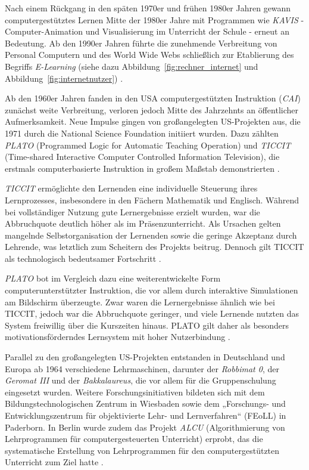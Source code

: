 Nach einem Rückgang in den späten 1970er und frühen 1980er Jahren gewann computergestütztes Lernen Mitte der 1980er Jahre mit Programmen wie \textit{KAVIS} - Computer-Animation und Visualisierung im Unterricht der Schule - erneut an Bedeutung. Ab den 1990er Jahren führte die zunehmende Verbreitung von Personal Computern und des World Wide Webs schließlich zur Etablierung des Begriffs \textit{E-Learning} (siehe dazu Abbildung~\ref{fig:rechner_internet} und Abbildung~\ref{fig:internetnutzer}) \parencite[S.~11]{niegemann_kompendium_2008}.

\iffalse
 Ab den 1960er Jahren fanden in den USA computergestützten Instruktion (\textit{\ac{CAI}}) zunächst weite Verbreitung, verloren jedoch Mitte des Jahrzehnts an öffentlicher Aufmerksamkeit. Neue Impulse gingen von großangelegten US-Projekten aus, die 1971 durch die National Science Foundation initiiert wurden. Dazu zählten \textit{PLATO} (Programmed Logic for Automatic Teaching Operation) und \textit{TICCIT} (Time-shared Interactive Computer Controlled Information Television), die erstmals computerbasierte Instruktion in großem Maßstab demonstrierten \parencites[S.~7]{niegemann_kompendium_2008}[S.~69ff]{oshea_lernen_1986}.

\textit{TICCIT} ermöglichte den Lernenden eine individuelle Steuerung ihres Lernprozesses, insbesondere in den Fächern Mathematik und Englisch. Während bei vollständiger Nutzung gute Lernergebnisse erzielt wurden, war die Abbruchquote deutlich höher als im Präsenzunterricht. Als Ursachen gelten mangelnde Selbstorganisation der Lernenden sowie die geringe Akzeptanz durch Lehrende, was letztlich zum Scheitern des Projekts beitrug. Dennoch gilt TICCIT als technologisch bedeutsamer Fortschritt \parencites[S.~71]{oshea_lernen_1986}[S.~13]{schonfeld_computerbasiertes_2006}.

\textit{PLATO} bot im Vergleich dazu eine weiterentwickelte Form computerunterstützter Instruktion, die vor allem durch interaktive Simulationen am Bildschirm überzeugte. Zwar waren die Lernergebnisse ähnlich wie bei TICCIT, jedoch war die Abbruchquote geringer, und viele Lernende nutzten das System freiwillig über die Kurszeiten hinaus. PLATO gilt daher als besonders motivationsförderndes Lernsystem mit hoher Nutzerbindung \parencites[S.~75f]{oshea_lernen_1986}[S.~14]{schonfeld_computerbasiertes_2006}.

Parallel zu den großangelegten US-Projekten entstanden in Deutschland und Europa ab 1964 verschiedene Lehrmaschinen, darunter der \textit{Robbimat 0}, der \textit{Geromat III} und der \textit{Bakkalaureus}, die vor allem für die Gruppenschulung eingesetzt wurden. Weitere Forschungsinitiativen bildeten sich mit dem Bildungstechnologischen Zentrum in Wiesbaden sowie dem „Forschungs- und Entwicklungszentrum für objektivierte Lehr- und Lernverfahren“ (FEoLL) in Paderborn. In Berlin wurde zudem das Projekt \textit{ALCU} (Algorithmierung von Lehrprogrammen für computergesteuerten Unterricht) erprobt, das die systematische Erstellung von Lehrprogrammen für den computergestützten Unterricht zum Ziel hatte \parencites[S.~10]{niegemann_kompendium_2008}[S.~11]{schonfeld_computerbasiertes_2006}.

